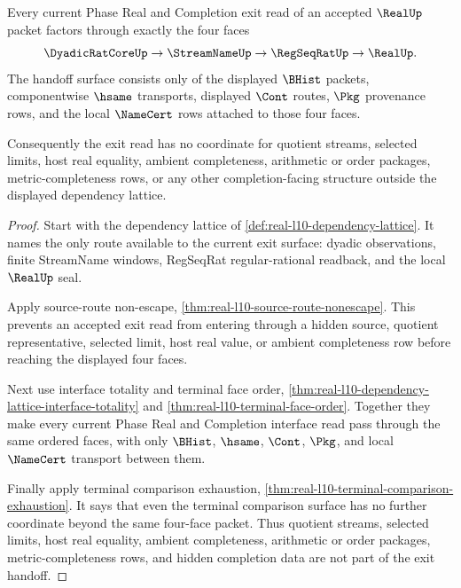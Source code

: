 \begin{theorem}
\label{thm:real-l10-dependency-lattice-exit-handoff}
Every current Phase Real and Completion exit read of an accepted $\RealUp$
packet factors through exactly the four faces
$$
\DyadicRatCoreUp \to \StreamNameUp \to \RegSeqRatUp \to \RealUp.
$$
The handoff surface consists only of the displayed $\BHist$ packets,
componentwise $\hsame$ transports, displayed $\Cont$ routes, $\Pkg$
provenance rows, and the local $\NameCert$ rows attached to those four faces.

Consequently the exit read has no coordinate for quotient streams, selected
limits, host real equality, ambient completeness, arithmetic or order
packages, metric-completeness rows, or any other completion-facing structure
outside the displayed dependency lattice.
\end{theorem}
\begin{proof}
Start with the dependency lattice of
\autoref{def:real-l10-dependency-lattice}. It names the only route available
to the current exit surface: dyadic observations, finite StreamName windows,
RegSeqRat regular-rational readback, and the local $\RealUp$ seal.

Apply source-route non-escape,
\autoref{thm:real-l10-source-route-nonescape}. This prevents an accepted
exit read from entering through a hidden source, quotient representative,
selected limit, host real value, or ambient completeness row before reaching
the displayed four faces.

Next use interface totality and terminal face order,
\autoref{thm:real-l10-dependency-lattice-interface-totality} and
\autoref{thm:real-l10-terminal-face-order}. Together they make every current
Phase Real and Completion interface read pass through the same ordered faces,
with only $\BHist$, $\hsame$, $\Cont$, $\Pkg$, and local $\NameCert$
transport between them.

Finally apply terminal comparison exhaustion,
\autoref{thm:real-l10-terminal-comparison-exhaustion}. It says that even the
terminal comparison surface has no further coordinate beyond the same
four-face packet. Thus quotient streams, selected limits, host real equality,
ambient completeness, arithmetic or order packages, metric-completeness rows,
and hidden completion data are not part of the exit handoff.
\end{proof}


